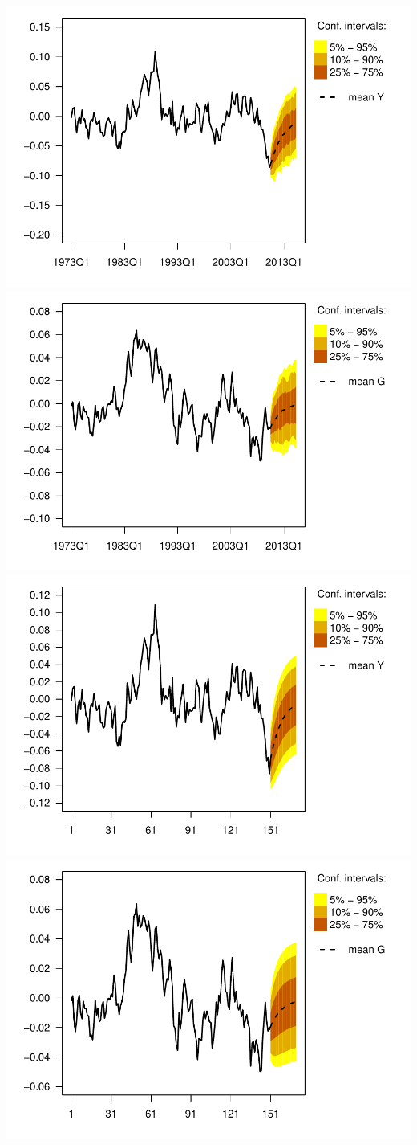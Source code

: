 \documentclass[12pt,a4paper,]{article}
\newcommand{\0}{\mathbf{0}}
\begin{document}
\begin{center}\includegraphics{figure/minimal-dsge7-1} \includegraphics{figure/minimal-dsge7-2} \includegraphics{figure/minimal-dsge7-3} \includegraphics{figure/minimal-dsge7-4} \end{center}


\end{document}
